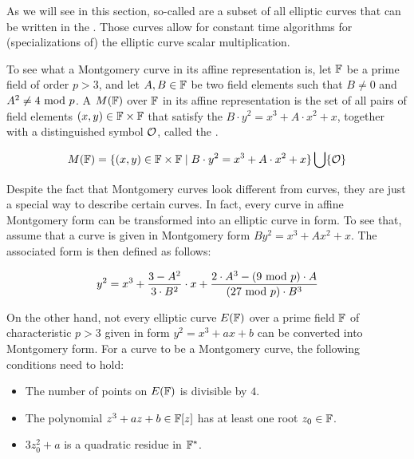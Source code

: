 As we will see in this section, so-called  are a subset of all elliptic curves that can be written in the . Those curves allow for constant time algorithms for (specializations of) the elliptic curve scalar multiplication. 

To see what a Montgomery curve in its affine representation is, let $\mathbb{F}$ be a prime field of order $p>3$, and let $A,B\in \mathbb{F}$ be two field elements such that $B\neq 0$ and $A^2 \neq 4 \text{ mod } p$.  A  $M(\mathbb{F})$ over $\mathbb{F}$ in its affine representation is the set of all pairs of field elements $(x,y)\in \mathbb{F}\times \mathbb{F}$ that satisfy the  $B\cdot y^2 = x^3 + A\cdot x^2 + x$, together with a distinguished symbol $\mathcal{O}$, called the .

\begin{equation}
\label{eq:montgomery-curve}
M(\mathbb{F}) = \{(x,y)\in \mathbb{F}\times \mathbb{F}\;|\; B\cdot y^2 = x^3 + A\cdot x^2 + x  \} \bigcup \{\mathcal{O}\}
\end{equation}

Despite the fact that Montgomery curves look different from  curves, they are just a special way to describe certain  curves. In fact, every curve in affine Montgomery form can be transformed into an elliptic curve in  form. To see that, assume that a curve is given in Montgomery form $B y^2 = x^3 + A x^2 + x$. The associated  form is then defined as follows:

\begin{equation}\label{eq:montgomery-to-weierstrass}
y^2 = x^3 + \frac{3-A^2}{3\cdot B^2}\cdot x + \frac{2\cdot A^3-(9 \text{ mod } p)\cdot A}{(27 \text{ mod } p)\cdot B^3}
\end{equation}

On the other hand, not every elliptic curve $E(\mathbb{F})$ over a prime field $\mathbb{F}$ of characteristic $p>3$ given in  form $y^2 = x^3 + a x + b$ can be converted into Montgomery form. For a  curve to be a Montgomery curve, the following conditions need to hold:

\begin{definition}\label{def:montgomery}

\begin{itemize}
\item The number of points on $E(\mathbb{F})$ is divisible by $4$.
\item The polynomial $z^3 + a z + b \in \mathbb{F}[z]$ has at least one root $z_0\in\mathbb{F}$.
\item $3z_0^2 + a$ is a quadratic residue in $\mathbb{F}^*$.
\end{itemize}
\end{definition}

